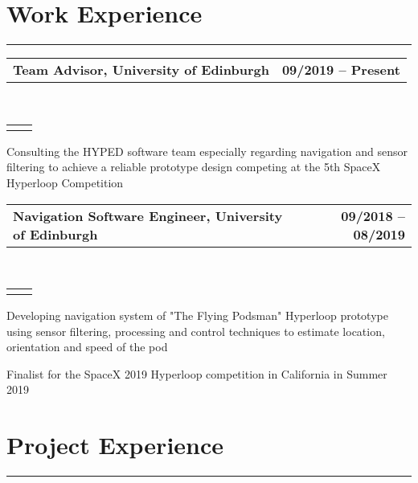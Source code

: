 \documentclass[]{deedy-resume}
\makeatletter
\newcommand{\headerrow}[2]
{\begin{tabular*}{\linewidth}{l@{\extracolsep{\fill}}r}
	\fontspec{Helvetica}\fontsize{12pt}{12pt}\selectfont\bfseries{\color{subheadings}#1} &
	\fontspec{Helvetica}\fontsize{12pt}{12pt}\selectfont\bfseries{\color{subheadings}#2} \\
\end{tabular*}}
\newcommand{\locationrow}[2]
{\begin{tabular*}{\linewidth}{l@{\extracolsep{\fill}}r}
        \color{headings}\scshape\fontspec{Heiti TC Medium}\fontsize{10pt}{12pt}\selectfont{#1}  &
        \color{headings}\scshape\fontspec{Heiti TC Medium}\fontsize{10pt}{12pt}\selectfont{#2}  \\
\end{tabular*}}
\makeatother
\begin{document}
\section*{Work Experience}
\hrule
\vspace{0.4em}

\noindent
\headerrow{Team Advisor, University of Edinburgh}{09/2019 -- Present}
\\
\locationrow{HYPED -- University of Edinburgh Hyperloop Team}{}
\begin{tightitemize}{1.7em}
    \item Consulting the HYPED software team especially regarding navigation and sensor filtering to achieve a reliable prototype design competing at the 5th SpaceX Hyperloop Competition
\end{tightitemize}
\largesectionsep

\noindent
\headerrow{Navigation Software Engineer, University of Edinburgh}{09/2018 -- 08/2019}
\\
\locationrow{HYPED -- University of Edinburgh Hyperloop Team}{}
\begin{tightitemize}{1.7em}
    \item Developing navigation system of "The Flying Podsman" Hyperloop prototype using sensor filtering, processing and control techniques to estimate location, orientation and speed of the pod
    \item Finalist for the SpaceX 2019 Hyperloop competition in California in Summer 2019
\end{tightitemize}
\largesectionsep




\section*{Project Experience}
\hrule
\vspace{0.4em}
\end{document}
